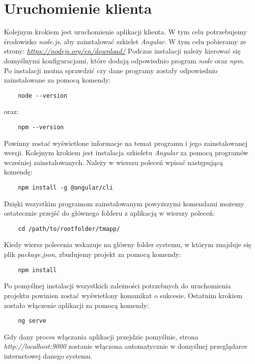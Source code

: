 \section{Uruchomienie klienta}
Kolejnym krokiem jest uruchomienie aplikacji klienta.
W tym celu potrzebujemy środowisko \textit{node.js}, aby zainstalować szkielet \textit{Angular}. W tym celu pobieramy ze strony: \textit{\url{https://nodejs.org/en/download/}} 
Podczas instalacji należy kierować się domyślnymi konfiguracjami, które dodają odpowiednio program \textit{node} oraz \textit{npm}. Po instalacji można sprawdzić czy dane programy zostały odpowiednio zainstalowane za pomocą komendy:
 \begin{lstlisting}
    node --version
\end{lstlisting}
oraz:
\begin{lstlisting}
    npm --version
\end{lstlisting}
Powinny zostać wyświetlone informacje na temat programu i jego zainstalowanej wersji. 
Kolejnym krokiem jest instalacja szkieletu \textit{Angular} za pomocą programów wcześniej zainstalowanych. 
Należy w wierszu poleceń wpisać następującą komendę:
\begin{lstlisting}
    npm install -g @angular/cli
\end{lstlisting}
Dzięki wszystkim programom zainstalowanym powyższymi komendami możemy ostatecznie przejść do głównego folderu z aplikacją w wierszy poleceń: \begin{lstlisting}
    cd /path/to/rootfolder/tmapp/
\end{lstlisting}
Kiedy wiersz polecenia wskazuje na główny folder systemu, w którym znajduje się plik \textit{package.json}, zbudujemy projekt za pomocą komendy:

\begin{lstlisting}
    npm install
\end{lstlisting}

Po pomyślnej instalacji wszystkich zależności potrzebnych do uruchomienia projektu powinien zostać wyświetlony komunikat o sukcesie.
Ostatnim krokiem zostało włączenie aplikacji za pomocą komendy:
\begin{lstlisting}
    ng serve
\end{lstlisting}
Gdy dany proces włączania aplikacji przejdzie pomyślnie, strona \textit{http://localhost:9000} zostanie włączona automatycznie w domyślnej przeglądarce internetowej danego systemu.





